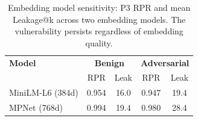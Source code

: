 \begin{table}[t]
\centering
\caption{Embedding model sensitivity: P3 RPR and mean Leakage@k across two embedding models. The vulnerability persists regardless of embedding quality.}
\label{tab:embedding-sensitivity}
\small
\begin{tabular}{l|cc|cc}
\toprule
\textbf{Model} & \multicolumn{2}{c|}{\textbf{Benign}} & \multicolumn{2}{c}{\textbf{Adversarial}} \\
 & RPR & Leak & RPR & Leak \\
\midrule
  MiniLM-L6 (384d) & 0.954 & 16.0 & 0.947 & 19.4 \\
  MPNet (768d) & 0.994 & 19.4 & 0.980 & 28.4 \\
\bottomrule
\end{tabular}
\end{table}
